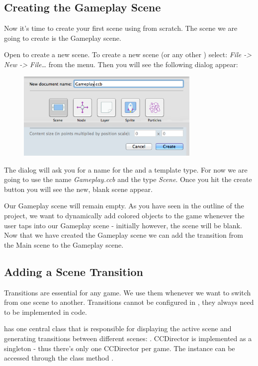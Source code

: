 \subsection{Creating the Gameplay Scene}
Now it's time to create your first scene using \SB{} from scratch. The scene we
are going to create is the Gameplay scene. 

\begin{leftbar}
Open \SB{} to create a new scene. To create a new scene (or any
other \ccbfile{}) select: \textit{File -> New -> File\ldots} from the \SB{} menu.
Then you will see the following dialog appear:

\begin{figure}[H]
		\centering
		\includegraphics[width=250pt]{images/firstproject/new_scene.png}
\end{figure}

The dialog will ask you for a name for the \ccbfile{} and a template type. For
now we are going to use the name \textit{Gameplay.ccb} and the type
\textit{Scene}. Once you hit the create button you will see the new, blank
scene appear.
\end{leftbar}

Our Gameplay scene will remain empty. As you have seen in the outline
of the project, we want to dynamically add colored objects to the game whenever
the user taps into our Gameplay scene - initially however, the scene will be
blank. Now that we have created the Gameplay scene we can add the transition
from the Main scene to the Gameplay scene.

\subsection{Adding a Scene Transition}
Transitions  are essential for any game. We use them
whenever we want to switch from one scene to another. Transitions cannot be configured in
\SB{}, they always need to be implemented in code.

\cocos{} has one central class that is responsible for displaying the active
scene and generating transitions between different scenes:
. CCDirector is implemented as a
singleton - thus there's only one CCDirector per \cocos{} game. The instance can be accessed
through the class method .

